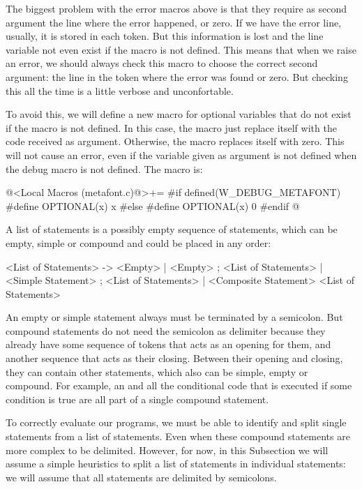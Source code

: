 The biggest problem with the error macros above is that they require
as second argument the line where the error happened, or zero. If we
have the error line, usually, it is stored in each token. But this
information is lost and the line variable not even exist if the
macro  is not defined. This means that
when we raise an error, we should always check this macro to choose
the correct second argument: the line in the token where the error was
found or zero. But checking this all the time is a little verbose and
unconfortable.

To avoid this, we will define a new macro for optional variables that
do not exist if the macro  is not
defined. In this case, the macro just replace itself with the code
received as argument. Otherwise, the macro replaces itself with
zero. This will not cause an error, even if the variable given as
argument is not defined when the debug macro is not defined. The macro
is:

\iniciocodigo
@<Local Macros (metafont.c)@>+=
#if defined(W_DEBUG_METAFONT)
#define OPTIONAL(x) x
#else
#define OPTIONAL(x) 0
#endif
@
\fimcodigo




A list of statements is a possibly empty sequence of statements, which
can be empty, simple or compound and could be placed in any order:

\alinhaverbatim
<List of Statements> -> <Empty> |
                        <Empty> ; <List of Statements> |
                        <Simple Statement> ; <List of Statements> |
                        <Composite Statement> <List of Statements>
\alinhanormal

An empty or simple statement always must be terminated by a
semicolon. But compound statements do not need the semicolon as
delimiter because they already have some sequence of tokens that acts
as an opening for them, and another sequence that acts as their
closing. Between their opening and closing, they can contain other
statements, which also can be simple, empty or compound. For example,
an  and all the conditional code that is executed if
some condition is true are all part of a single compound statement.

To correctly evaluate our programs, we must be able to identify and
split single statements from a list of statements. Even when these
compound statements are more complex to be delimited. However, for
now, in this Subsection we will assume a simple heuristics to split
a list of statements in individual statements: we will assume that
all statements are delimited by semicolons.

